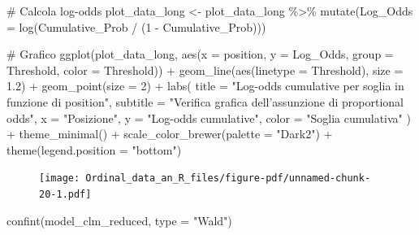 \documentclass[
  letterpaper,
  DIV=11,
  numbers=noendperiod]{scrartcl}
\newenvironment{Shaded}{\begin{snugshade}}{\end{snugshade}}
\newcommand{\AttributeTok}[1]{\textcolor[rgb]{0.40,0.45,0.13}{#1}}
\newcommand{\CommentTok}[1]{\textcolor[rgb]{0.37,0.37,0.37}{#1}}
\newcommand{\DecValTok}[1]{\textcolor[rgb]{0.68,0.00,0.00}{#1}}
\newcommand{\FloatTok}[1]{\textcolor[rgb]{0.68,0.00,0.00}{#1}}
\newcommand{\FunctionTok}[1]{\textcolor[rgb]{0.28,0.35,0.67}{#1}}
\newcommand{\NormalTok}[1]{\textcolor[rgb]{0.00,0.23,0.31}{#1}}
\newcommand{\OtherTok}[1]{\textcolor[rgb]{0.00,0.23,0.31}{#1}}
\newcommand{\SpecialCharTok}[1]{\textcolor[rgb]{0.37,0.37,0.37}{#1}}
\newcommand{\StringTok}[1]{\textcolor[rgb]{0.13,0.47,0.30}{#1}}
\begin{document}
\begin{Shaded}
\begin{Highlighting}[]
\CommentTok{\# Calcola log{-}odds}
\NormalTok{plot\_data\_long }\OtherTok{\textless{}{-}}\NormalTok{ plot\_data\_long }\SpecialCharTok{\%\textgreater{}\%}
  \FunctionTok{mutate}\NormalTok{(}\AttributeTok{Log\_Odds =} \FunctionTok{log}\NormalTok{(Cumulative\_Prob }\SpecialCharTok{/}\NormalTok{ (}\DecValTok{1} \SpecialCharTok{{-}}\NormalTok{ Cumulative\_Prob)))}

\CommentTok{\# Grafico}
\FunctionTok{ggplot}\NormalTok{(plot\_data\_long, }\FunctionTok{aes}\NormalTok{(}\AttributeTok{x =}\NormalTok{ position, }\AttributeTok{y =}\NormalTok{ Log\_Odds, }\AttributeTok{group =}\NormalTok{ Threshold, }\AttributeTok{color =}\NormalTok{ Threshold)) }\SpecialCharTok{+}
  \FunctionTok{geom\_line}\NormalTok{(}\FunctionTok{aes}\NormalTok{(}\AttributeTok{linetype =}\NormalTok{ Threshold), }\AttributeTok{size =} \FloatTok{1.2}\NormalTok{) }\SpecialCharTok{+}
  \FunctionTok{geom\_point}\NormalTok{(}\AttributeTok{size =} \DecValTok{2}\NormalTok{) }\SpecialCharTok{+}
  \FunctionTok{labs}\NormalTok{(}
    \AttributeTok{title =} \StringTok{"Log{-}odds cumulative per soglia in funzione di \textquotesingle{}position\textquotesingle{}"}\NormalTok{,}
    \AttributeTok{subtitle =} \StringTok{"Verifica grafica dell’assunzione di proportional odds"}\NormalTok{,}
    \AttributeTok{x =} \StringTok{"Posizione"}\NormalTok{,}
    \AttributeTok{y =} \StringTok{"Log{-}odds cumulative"}\NormalTok{,}
    \AttributeTok{color =} \StringTok{"Soglia cumulativa"}
\NormalTok{  ) }\SpecialCharTok{+}
  \FunctionTok{theme\_minimal}\NormalTok{() }\SpecialCharTok{+}
  \FunctionTok{scale\_color\_brewer}\NormalTok{(}\AttributeTok{palette =} \StringTok{"Dark2"}\NormalTok{) }\SpecialCharTok{+}
  \FunctionTok{theme}\NormalTok{(}\AttributeTok{legend.position =} \StringTok{"bottom"}\NormalTok{)}
\end{Highlighting}
\end{Shaded}

\begin{figure}[H]

{\centering \texttt{[image: Ordinal\_data\_an\_R\_files/figure-pdf/unnamed-chunk-20-1.pdf]}

}

\end{figure}

\begin{Shaded}
\begin{Highlighting}[]
\FunctionTok{confint}\NormalTok{(model\_clm\_reduced, }\AttributeTok{type =} \StringTok{"Wald"}\NormalTok{)}
\end{Highlighting}
\end{Shaded}
\end{document}
